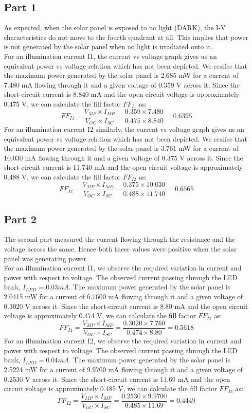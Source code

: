\documentclass[12pt]{article}
\begin{document}
\subsection{Part 1}
As expected, when the solar panel is exposed to no light (DARK), the I-V characteristics do not move to the fourth quadrant at all. This implies that power is not generated by the solar panel when no light is irradiated onto it.\\
For an illumination current I1, the current vs voltage graph gives us an equivalent power vs voltage relation which has not been depicted. We realise that the maximum power generated by the solar panel is 2.685 mW for a current of 7.480 mA flowing through it and a given voltage of 0.359 V across it. Since the short-circuit current is 8.840 mA and the open circuit voltage is approximately 0.475 V, we can calculate the fill factor \( FF_{I1} \) as: \[ FF_{I1} = \frac{V_{MP} \times I_{MP}}{V_{OC} \times I_{SC}} = \frac{0.359 \times 7.480}{0.475 \times 8.840} = 0.6395\]
For an illumination current I2 similarly, the current vs voltage graph gives us an equivalent power vs voltage relation which has not been depicted. We realise that the maximum power generated by the solar panel is 3.761 mW for a current of 10.030 mA flowing through it and a given voltage of 0.375 V across it. Since the short-circuit current is 11.740 mA and the open circuit voltage is approximately 0.488 V, we can calculate the fill factor \( FF_{I2} \) as: \[ FF_{I2} = \frac{V_{MP} \times I_{MP}}{V_{OC} \times I_{SC}} = \frac{0.375 \times 10.030}{0.488 \times 11.740} = 0.6565\]

\subsection{Part 2}

The second part measured the current flowing through the resistance and the voltage across the same. Hence both these values were positive when the solar panel was generating power.\\
For an illumination current I1, we observe the required variation in current and power with respect to voltage. The observed current passing through the LED bank, \( I_{LED} = 0.03 mA \). The maximum power generated by the solar panel is 2.0415 mW for a current of 6.7600 mA flowing through it and a given voltage of 0.3020 V across it. Since the short-circuit current is 8.80 mA and the open circuit voltage is approximately 0.474 V, we can calculate the fill factor \( FF_{I1} \) as: \[ FF_{I1} = \frac{V_{MP} \times I_{MP}}{V_{OC} \times I_{SC}} = \frac{0.3020 \times 7.760}{0.474 \times 8.80} = 0.5618\]
For an illumination current I2, we observe the required variation in current and power with respect to voltage. The observed current passing through the LED bank, \( I_{LED} = 0.04 mA \). The maximum power generated by the solar panel is 2.5224 mW for a current of 9.9700 mA flowing through it and a given voltage of 0.2530 V across it. Since the short-circuit current is 11.69 mA and the open circuit voltage is approximately 0.485 V, we can calculate the fill factor \( FF_{I2} \) as: \[ FF_{I2} = \frac{V_{MP} \times I_{MP}}{V_{OC} \times I_{SC}} = \frac{0.2530 \times 9.9700}{0.485 \times 11.69} = 0.4449\]
\end{document}
